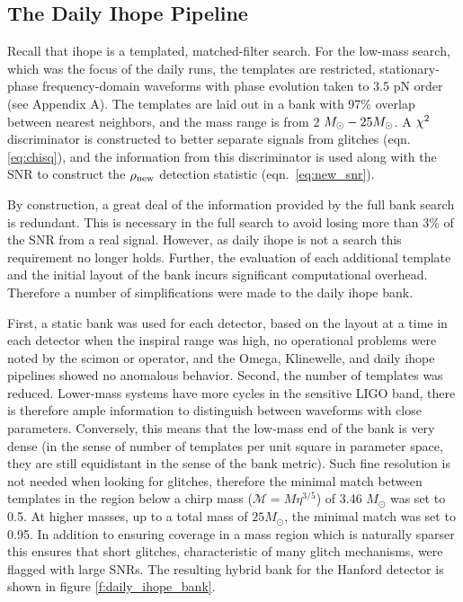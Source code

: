 \subsection{The Daily Ihope Pipeline}

Recall that ihope is a templated, matched-filter search.  For the
low-mass search, which was the focus of the daily runs, the templates
are restricted, stationary-phase frequency-domain waveforms with phase
evolution taken to 3.5 pN order (see Appendix A).  The templates are
laid out in a bank with 97\% overlap between nearest neighbors, and
the mass range is from 2 $M_\odot - 25 M_\odot$.  A $\chi^2$ discriminator
is constructed to better separate signals from glitches
(eqn.\ref{eq:chisq}), and the information from this discriminator is
used along with the SNR to construct the $\rho_{\textrm{new}}$ detection statistic
(eqn.~\ref{eq:new_snr}).

By construction, a great deal of the information provided by the full
bank search is redundant.  This is necessary in the full search to
avoid losing more than 3\% of the SNR from a real signal.  However, as
daily ihope is not a search this requirement no longer holds.
Further, the evaluation of each additional template and the initial
layout of the bank incurs significant computational overhead.
Therefore a number of simplifications were made to the daily ihope
bank.

First, a static bank was used for each detector, based on the layout at a
time in each detector when the inspiral range was high, no
operational problems were noted by the scimon or operator, and the
Omega, Klinewelle, and daily ihope pipelines showed no anomalous behavior.
Second, the number of templates was reduced.  Lower-mass systems have
more cycles in the sensitive LIGO band, there is therefore ample
information to distinguish between waveforms with close parameters.
Conversely, this means that the low-mass end of the bank is very dense
(in the sense of number of templates per unit square in parameter
space, they are still equidistant in the sense of the bank metric).
Such fine resolution is not needed when looking for glitches,
therefore the minimal match between templates in the region below a
chirp mass ($\mathcal{M} = M \eta^{3/5}$) of 3.46 $M_\odot$ was set to
0.5.  At higher masses, up to a total mass of $25 M_\odot$, the
minimal match was set to 0.95.  In addition to ensuring coverage in a
mass region which is naturally sparser this ensures that short
glitches, characteristic of many glitch mechanisms, were flagged with
large SNRs.  The resulting hybrid bank for the Hanford detector is
shown in figure \ref{f:daily_ihope_bank}.

